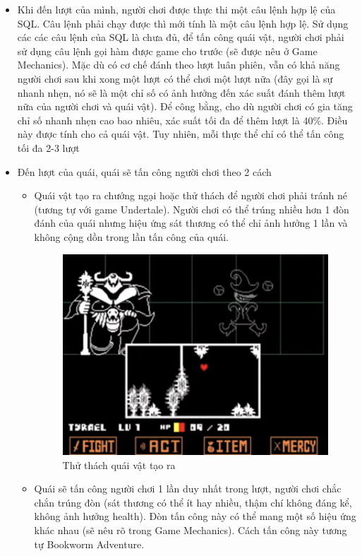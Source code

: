\begin{itemize}
	\item Khi đến lượt của mình, người chơi được thực thi một câu lệnh hợp lệ của SQL. Câu lệnh phải chạy được thì mới tính là một câu lệnh hợp lệ. Sử dụng các các câu lệnh của SQL là chưa đủ, để tấn công quái vật, người chơi phải sử dụng câu lệnh gọi hàm được game cho trước (sẽ được nêu ở Game Mechanics). Mặc dù có cơ chế đánh theo lượt luân phiên, vẫn có khả năng người chơi sau khi xong một lượt có thể chơi một lượt nữa (đây gọi là sự nhanh nhẹn, nó sẽ là một chỉ số có ảnh hưởng đến xác suất đánh thêm lượt nữa của người chơi và quái vật). Để công bằng, cho dù người chơi có gia tăng chỉ số nhanh nhẹn cao bao nhiêu, xác suất tối đa để thêm lượt là 40\%. Điều này được tính cho cả quái vật. Tuy nhiên, mỗi thực thể chỉ có thể tấn công tối đa 2-3 lượt
	\item Đến lượt của quái, quái sẽ tấn công người chơi theo 2 cách
	\begin{itemize}
		\item Quái vật tạo ra chướng ngại hoặc thử thách để người chơi phải tránh né (tương tự với game Undertale). Người chơi có thể trúng nhiều hơn 1 đòn đánh của quái nhưng hiệu ứng sát thương có thể chỉ ảnh hưởng 1 lần và không cộng dồn trong lần tấn công của quái.
		
		\begin{figure}[H]
			\centering
			\includegraphics[width=10cm]{Images/MonsterAttack1.png}
			\vspace{0.5cm}
			\caption{Thử thách quái vật tạo ra}
		\end{figure}
		
		\item Quái sẽ tấn công người chơi 1 lần duy nhất trong lượt, người chơi chắc chắn trúng đòn (sát thương có thể ít hay nhiều, thậm chí không đáng kể, không ảnh hưởng health). Đòn tấn công này có thể mang một số hiệu ứng khác nhau (sẽ nêu rõ trong Game Mechanics). Cách tấn công này tương tự Bookworm Adventure.
		

\end{itemize}
\end{itemize}
